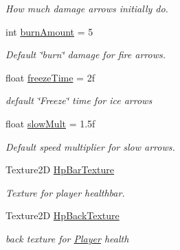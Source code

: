 \begin{DoxyCompactItemize}
\begin{DoxyCompactList}\small\item\em How much damage arrows initially do. \end{DoxyCompactList}\item 
\mbox{\label{class_player_ab8d9c5f386d98a1b32ccc928f8d4d29b}} 
int \hyperlink{class_player_ab8d9c5f386d98a1b32ccc928f8d4d29b}{burn\+Amount} = 5
\begin{DoxyCompactList}\small\item\em Default \char`\"{}burn\char`\"{} damage for fire arrows. \end{DoxyCompactList}\item 
\mbox{\label{class_player_a1723357f7c7ee28c6fe9d366708e83e8}} 
float \hyperlink{class_player_a1723357f7c7ee28c6fe9d366708e83e8}{freeze\+Time} = 2f
\begin{DoxyCompactList}\small\item\em default \char`\"{}\+Freeze\char`\"{} time for ice arrows \end{DoxyCompactList}\item 
\mbox{\label{class_player_a17b09d930d828bb77903afa04073c3b2}} 
float \hyperlink{class_player_a17b09d930d828bb77903afa04073c3b2}{slow\+Mult} = 1.\+5f
\begin{DoxyCompactList}\small\item\em Default speed multiplier for slow arrows. \end{DoxyCompactList}\item 
\mbox{\label{class_player_a98d070bc739f23a42d48d3eae30badd0}} 
Texture2D \hyperlink{class_player_a98d070bc739f23a42d48d3eae30badd0}{Hp\+Bar\+Texture}
\begin{DoxyCompactList}\small\item\em Texture for player healthbar. \end{DoxyCompactList}\item 
\mbox{\label{class_player_a91d04489f1b738260a27fba902157f9b}} 
Texture2D \hyperlink{class_player_a91d04489f1b738260a27fba902157f9b}{Hp\+Back\+Texture}
\begin{DoxyCompactList}\small\item\em back texture for \hyperlink{class_player}{Player} health \end{DoxyCompactList}\end{DoxyCompactItemize}
